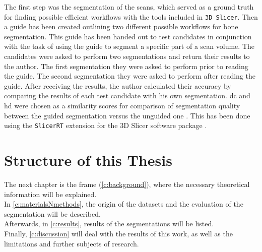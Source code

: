 \noindent
The first step was the segmentation of the \mct\space scans, which served as a ground truth for finding possible efficient workflows with the tools included in \texttt{3D Slicer}.
Then a guide has been created outlining two different possible workflows for bone segmentation.
This guide has been handed out to test candidates in conjunction with the task of using the guide to segment a specific part of a scan volume.
The candidates were asked to perform two segmentations and return their results to the author.
The first segmentation they were asked to perform prior to reading the guide.
The second segmentation they were asked to perform after reading the guide.
After receiving the results, the author calculated their accuracy by comparing the results of each test candidate with his own segmentation.
\acrfull{dc} and \acrfull{hd} were chosen as a similarity scores for comparison of segmentation quality between the guided segmentation versus the unguided one \cite{diceMeasuresAmountEcologic1945,hausdorffGrundzuegeMengenlehre1978}.
This has been done using the \texttt{SlicerRT} extension for the 3D Slicer software package \cite{pinterSlicerRTRadiationTherapy2012}.


\section{Structure of this Thesis}\label{s:introduction-structureofthisthesis}
The next chapter is the frame (\cref{c:background}), where the necessary theoretical information will be explained.\\
In \cref{c:materialsNmethods}, the origin of the datasets and the evaluation of the segmentation will be described.\\
Afterwards, in \cref{c:results}, results of the segmentations will be listed.\\
Finally, \cref{c:discussion} will deal with the results of this work, as well as
the limitations and further subjects of research.
